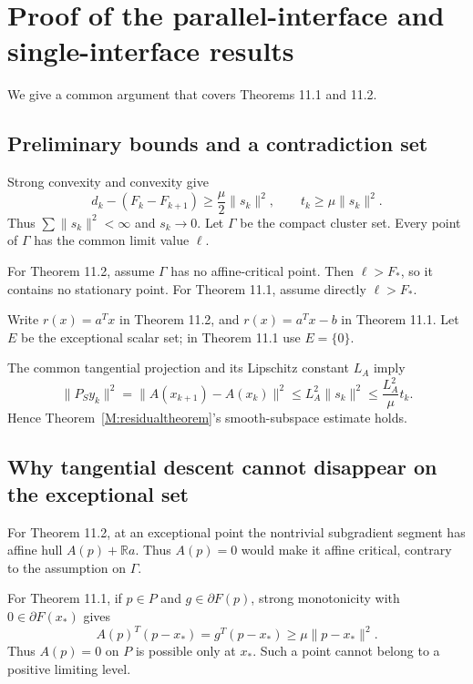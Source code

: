 \section{Proof of the parallel-interface and single-interface
results}\label{U:proof-of-the-parallel-interface-and-single-interface-results}

We give a common argument that covers Theorems 11.1 and 11.2.



\subsection{Preliminary bounds and a contradiction
set}\label{U:preliminary-bounds-and-a-contradiction-set}

Strong convexity and convexity give \[
 d_k-(F_k-F_{k+1})\ge\frac\mu2\|s_k\|^2,
 \qquad t_k\ge\mu\|s_k\|^2.\tag{11.10}
\] Thus \(\sum\|s_k\|^2<\infty\) and \(s_k\to0\). Let \(\Gamma\) be the
compact cluster set. Every point of \(\Gamma\) has the common limit
value \(\ell\).

For Theorem 11.2, assume \(\Gamma\) has no affine-critical point. Then
\(\ell>F_*\), so it contains no stationary point. For Theorem 11.1, assume
directly \(\ell>F_*\).

Write \(r(x)=a^Tx\) in Theorem 11.2, and \(r(x)=a^Tx-b\) in Theorem 11.1. Let
\(E\) be the exceptional scalar set; in Theorem 11.1 use \(E=\{0\}\).

The common tangential projection and its Lipschitz constant \(L_A\)
imply \[
 \|P_S y_k\|^2=\|A(x_{k+1})-A(x_k)\|^2
 \le L_A^2\|s_k\|^2\le\frac{L_A^2}{\mu}t_k.\tag{11.11}
\] Hence Theorem~\ref{M:residualtheorem}'s smooth-subspace estimate holds.



\subsection{Why tangential descent cannot disappear on the
exceptional
set}\label{U:why-tangential-descent-cannot-disappear-on-the-exceptional-set}

For Theorem 11.2, at an exceptional point the nontrivial subgradient
segment has affine hull \(A(p)+\mathbb R a\). Thus \(A(p)=0\) would make
it affine critical, contrary to the assumption on \(\Gamma\).

For Theorem 11.1, if \(p\in P\) and \(g\in\partial F(p)\), strong
monotonicity with \(0\in\partial F(x_*)\) gives \[
 A(p)^T(p-x_*)=g^T(p-x_*)\ge\mu\|p-x_*\|^2.
\] Thus \(A(p)=0\) on \(P\) is possible only at \(x_*\). Such a point
cannot belong to a positive limiting level.

